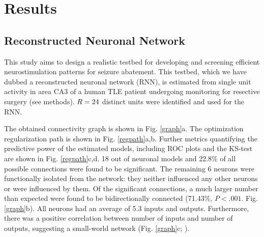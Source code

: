 \documentclass[11pt,a4paper,final]{article}
\begin{document}
\section{Results \label{results}}

    \subsection{Reconstructed Neuronal Network}

This study aims to design a realistic testbed for developing and screening efficient neurostimulation patterns for seizure abatement.
This testbed, which we have dubbed a reconstructed neuronal network (RNN), is estimated from single unit activity in area CA3 of a human TLE patient undergoing monitoring for resective surgery (see methods).
$R=24{}$ distinct units were identified and used for the RNN.

The obtained connectivity graph is shown in Fig. \ref{graph}a.
The optimization regularization path is shown in Fig. \ref{regpath}a,b.
Further metrics quantifying the predictive power of the estimated models, including ROC plots and the KS-test are shown in Fig. \ref{regpath}c,d.
18 out of \nn{} neuronal models and 22.8\% of all possible connections were found to be significant.
The remaining 6 neurons were functionally isolated from the network: they neither influenced any other neurons or were influenced by them.
Of the significant connections, a much larger number than expected were found to be bidirectionally connected (71.43\%, $P<.001$. Fig. \ref{graph}b).
All neurons had an average of 5.3 inputs and outputs.
Furthermore, there was a positive correlation between number of inputs and number of outputs, suggesting a small-world network (Fig. \ref{graph}c; \citet{sporns09,fallani14}).
\end{document}
